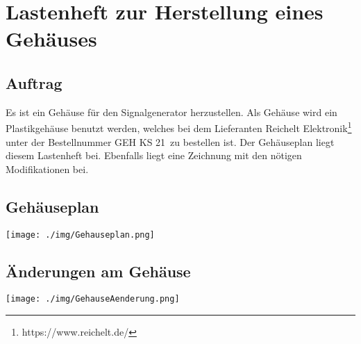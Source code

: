 \section{Lastenheft zur Herstellung eines Gehäuses}
\subsection{Auftrag}
Es ist ein Gehäuse für den Signalgenerator herzustellen. Als Gehäuse wird ein Plastikgehäuse benutzt werden, welches bei dem Lieferanten Reichelt Elektronik\footnote{https://www.reichelt.de/} unter der Bestellnummer \glqq GEH KS 21\grqq\ zu bestellen ist. Der Gehäuseplan liegt diesem Lastenheft bei. Ebenfalls liegt eine Zeichnung mit den nötigen Modifikationen bei.

\subsection{Gehäuseplan}
\begin{center}
\texttt{[image: ./img/Gehauseplan.png]}
\end{center}

\subsection{Änderungen am Gehäuse}
\begin{center}
\texttt{[image: ./img/GehauseAenderung.png]}
\end{center}
